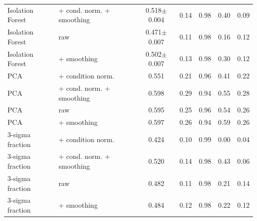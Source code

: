\begin{tabular}{llccccc}
Isolation Forest & + cond. norm. + smoothing & 0.518$\pm$0.004 & 0.14 & 0.98 & 0.40 & 0.09\\
Isolation Forest & raw & 0.471$\pm$0.007 & 0.11 & 0.98 & 0.16 & 0.12\\
Isolation Forest & + smoothing & 0.502$\pm$0.007 & 0.13 & 0.98 & 0.30 & 0.12\\
PCA & + condition norm. & 0.551 & 0.21 & 0.96 & 0.41 & 0.22\\
PCA & + cond. norm. + smoothing & 0.598 & 0.29 & 0.94 & 0.55 & 0.28\\
PCA & raw & 0.595 & 0.25 & 0.96 & 0.54 & 0.26\\
PCA & + smoothing & 0.597 & 0.26 & 0.94 & 0.59 & 0.26\\
3-sigma fraction & + condition norm. & 0.424 & 0.10 & 0.99 & 0.00 & 0.04\\
3-sigma fraction & + cond. norm. + smoothing & 0.520 & 0.14 & 0.98 & 0.43 & 0.06\\
3-sigma fraction & raw & 0.482 & 0.11 & 0.98 & 0.21 & 0.14\\
3-sigma fraction & + smoothing & 0.484 & 0.12 & 0.98 & 0.22 & 0.12\\
\bottomrule
\end{tabular}